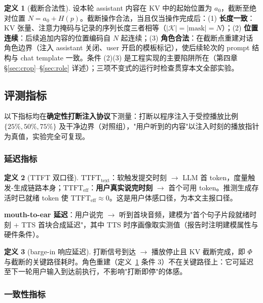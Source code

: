 \documentclass[conference]{IEEEtran}
\theoremstyle{definition}
\newtheorem{definition}{定义}
\begin{document}
\begin{definition}[截断合法性]\label{def:legal}
设本轮 assistant 内容在 KV 中的起始位置为 $a_0$，截断至绝对位置 $N = a_0 + H(p)$。截断操作合法，当且仅当操作完成后：(1) \textbf{长度一致}：KV 张量、注意力掩码与记录的序列长度三者相等（$|\mathcal{K}| = |\mathrm{mask}| = N$）；(2) \textbf{位置连续}：后续追加内容的位置编码自 $N$ 起连续；(3) \textbf{角色合法}：在截断点重建对话角色边界（注入 assistant 关闭、user 开启的模板标记），使后续轮次的 prompt 结构与 chat template 一致。条件 (2)(3) 是工程实现的主要陷阱所在（第四章 \S\ref{sec:crop}--\S\ref{sec:role} 详述）；三项不变式的运行时检查贯穿本文全部实验。
\end{definition}

\subsection{评测指标}
以下指标均在\textbf{确定性打断注入协议}下测量：打断以程序注入于受控播放比例 $\{25\%, 50\%, 75\%\}$ 及干净边界（对照组），"用户听到的内容"以注入时刻的播放指针为真值，实验完全可复现。

\subsubsection{延迟指标}

\begin{definition}[TTFT 双口径]\label{def:ttft}
$\mathrm{TTFT}_{\text{text}}$：软触发提交时刻 $\rightarrow$ LLM 首 token，度量触发-生成链路本身；$\mathrm{TTFT}_{\text{eff}}$：\textbf{用户真实说完时刻} $\rightarrow$ 首个可用 token。推测生成存活时已就绪 token 使 $\mathrm{TTFT}_{\text{eff}} \approx 0$。这是用户体感口径，为本文主报口径。
\end{definition}

\textbf{mouth-to-ear 延迟}：用户说完 $\rightarrow$ 听到首块音频，建模为"首个句子片段就绪时刻 + TTS 首块合成延迟"，其中 TTS 时序画像取实测值（报告时注明建模属性与硬件条件）。

\begin{definition}[barge-in 响应延迟]\label{def:bargein}
打断信号到达 $\rightarrow$ 播放停止且 KV 截断完成，即 $\Phi$ 与截断的关键路径耗时。角色重建（定义~\ref{def:legal} 条件 3）不在关键路径上：它可延迟至下一轮用户输入到达前执行，不影响"打断即停"的体感。
\end{definition}

\subsubsection{一致性指标}
\end{document}

